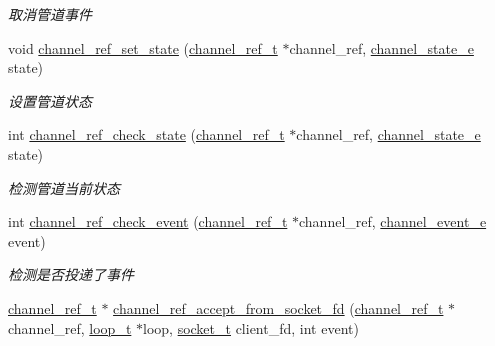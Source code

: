 \begin{DoxyCompactItemize}
\begin{DoxyCompactList}\small\item\em 取消管道事件 \end{DoxyCompactList}\item 
void \hyperlink{a00041_a7e19561cc06440ebdf63ced5526c9e21_a7e19561cc06440ebdf63ced5526c9e21}{channel\+\_\+ref\+\_\+set\+\_\+state} (\hyperlink{a00044_a151271c9d188ef28d4d24bb81dcc1263_a151271c9d188ef28d4d24bb81dcc1263}{channel\+\_\+ref\+\_\+t} $\ast$channel\+\_\+ref, \hyperlink{a00044_a1956eea3012f780b5d592a9d09d9873c_a1956eea3012f780b5d592a9d09d9873c}{channel\+\_\+state\+\_\+e} state)
\begin{DoxyCompactList}\small\item\em 设置管道状态 \end{DoxyCompactList}\item 
int \hyperlink{a00084_gadddbdc58824b567334d46493decc90f8_gadddbdc58824b567334d46493decc90f8}{channel\+\_\+ref\+\_\+check\+\_\+state} (\hyperlink{a00044_a151271c9d188ef28d4d24bb81dcc1263_a151271c9d188ef28d4d24bb81dcc1263}{channel\+\_\+ref\+\_\+t} $\ast$channel\+\_\+ref, \hyperlink{a00044_a1956eea3012f780b5d592a9d09d9873c_a1956eea3012f780b5d592a9d09d9873c}{channel\+\_\+state\+\_\+e} state)
\begin{DoxyCompactList}\small\item\em 检测管道当前状态 \end{DoxyCompactList}\item 
int \hyperlink{a00041_a7134a0dab5db76d26dac56924267e5ac_a7134a0dab5db76d26dac56924267e5ac}{channel\+\_\+ref\+\_\+check\+\_\+event} (\hyperlink{a00044_a151271c9d188ef28d4d24bb81dcc1263_a151271c9d188ef28d4d24bb81dcc1263}{channel\+\_\+ref\+\_\+t} $\ast$channel\+\_\+ref, \hyperlink{a00044_a5ad43ab162fdf9ad53cde10ed3d87d99_a5ad43ab162fdf9ad53cde10ed3d87d99}{channel\+\_\+event\+\_\+e} event)
\begin{DoxyCompactList}\small\item\em 检测是否投递了事件 \end{DoxyCompactList}\item 
\hyperlink{a00044_a151271c9d188ef28d4d24bb81dcc1263_a151271c9d188ef28d4d24bb81dcc1263}{channel\+\_\+ref\+\_\+t} $\ast$ \hyperlink{a00041_a8312d0f4fcecc79d87a261e8b462ce95_a8312d0f4fcecc79d87a261e8b462ce95}{channel\+\_\+ref\+\_\+accept\+\_\+from\+\_\+socket\+\_\+fd} (\hyperlink{a00044_a151271c9d188ef28d4d24bb81dcc1263_a151271c9d188ef28d4d24bb81dcc1263}{channel\+\_\+ref\+\_\+t} $\ast$channel\+\_\+ref, \hyperlink{a00044_a9c3ad1cd2de83e09f3a7b59fa82c94ee_a9c3ad1cd2de83e09f3a7b59fa82c94ee}{loop\+\_\+t} $\ast$loop, \hyperlink{a00044_a0d9e0afbf02fb6ed6c5b1415dce51b05_a0d9e0afbf02fb6ed6c5b1415dce51b05}{socket\+\_\+t} client\+\_\+fd, int event)

\end{DoxyCompactItemize}
